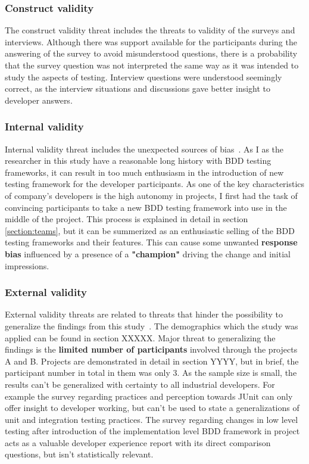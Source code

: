 \subsubsection{Construct validity}
The construct validity threat includes the threats to validity of the surveys and interviews. Although there was support available
for the participants during the answering of the survey to avoid misunderstood questions, there is a probability
that the survey question was not interpreted the same way as it was intended to study the aspects of testing. Interview questions
were understood seemingly correct, as the interview situations and discussions gave better insight to developer answers.
\subsubsection{Internal validity}
Internal validity threat includes the unexpected sources of bias~\cite{kitchenham2002preliminary}. As I as the researcher
in this study have a reasonable long history with BDD testing frameworks, it can result in too much enthusiasm in the introduction
of new testing framework for the developer participants. As one of the key characteristics of company's developers is the
high autonomy in projects, I first had the task of convincing participants to take a new BDD testing framework into use in the middle of the
project. This process is explained in detail in section \ref{section:teams}, but it can be summerized as an enthusiastic selling of the
BDD testing frameworks and their features. This can cause some unwanted \textbf{response bias} influenced by a presence of a \textbf{"champion"}
driving the change and initial impressions.
\subsubsection{External validity}
External validity threats are related to threats that hinder the possibility to generalize the findings from this study~\cite{runeson2012case}.
The demographics which the study was applied can be found in section XXXXX. Major threat to generalizing the findings
is the \textbf{limited number of participants} involved through the projects A and B. Projects are demonstrated in detail in section YYYY,
but in brief, the participant number in total in them was only 3. As the sample size is small, the results can't be generalized
with certainty to all industrial developers. For example the survey regarding practices and perception towards JUnit can
only offer insight to developer working, but can't be used to state a generalizations of unit and integration testing practices.
The survey regarding changes in low level testing after introduction of the implementation level BDD framework in project acts
as a valuable developer experience report with its direct comparison questions, but isn't statistically relevant.

